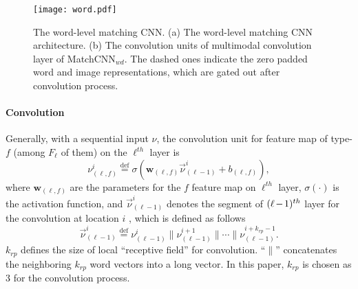 \documentclass[10pt,twocolumn,letterpaper]{article}
\begin{document}
\begin{figure}[t!]
\begin{center}
   \texttt{[image: word.pdf]}

\end{center}
   \caption{The word-level matching CNN. (a) The word-level matching CNN architecture. (b) The convolution units of multimodal convolution layer of MatchCNN${_{wd}}$.   The dashed ones indicate the zero padded word and image representations, which are gated out after convolution process.}
\label{fig:word}
\end{figure}


\vspace{-10pt}
\paragraph{Convolution} Generally, with a sequential input $\nu$, the convolution unit for feature map of type-$f$ (among $F_\ell$ of them)  on the $\ell^{th}$ layer is
\begin{equation}
\label{eq_convolution}
\nu_{(\ell, f)}^{i} \overset{\text{def}}{=}
\sigma(\mathbf{w}_{(\ell,f)} \vec{\nu}_{(\ell-1)}^{i} + b_{(\ell,f)}),
\end{equation}
where $\mathbf{w}_{(\ell, f)}$ are the parameters for the $f$ feature map on $\ell^{th}$ layer, $\sigma(\cdot)$ is the activation function, and $\vec{\nu}_{(\ell-1)}^{i}$ denotes the segment of $(\ell\hspace{-1pt}-\hspace{-1pt}1)^{th}$ layer for the convolution at location $i$ , which is defined as follows
\begin{equation}
\label{eq_segment}
\vec{\nu}_{(\ell-1)}^{i}  \overset{\text{def}}{=}  \nu_{(\ell-1)}^{i} \parallel \nu_{(\ell-1)}^{i+1} \parallel \cdots \parallel\nu_{(\ell-1)}^{i+k_{rp}-1}.
\end{equation}
$k_{rp}$ defines the size of local ``receptive field'' for convolution.  ``$\parallel$'' concatenates the neighboring $k_{rp}$ word vectors into a long vector. In this paper, $k_{rp}$ is chosen as 3 for the convolution process.
\end{document}
